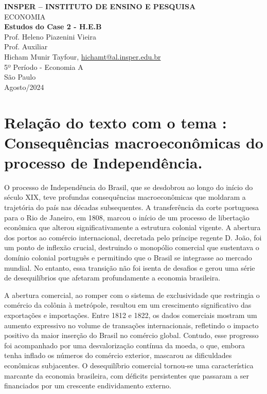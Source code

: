 \documentclass[a4paper,12pt]{article}[abntex2]
\begin{document}
\begin{titlepage}
    \centering
    \vspace*{1cm}
    \Large\textbf{INSPER – INSTITUTO DE ENSINO E PESQUISA}\\
    \Large ECONOMIA\\
    \vspace{1.5cm}
    \Large\textbf{Estudos do Case 2 - H.E.B}\\
    \vspace{1.5cm}
    Prof. Heleno Piazenini Vieira\\
    Prof. Auxiliar \\
    \vfill
    \normalsize
    Hicham Munir Tayfour, \href{mailto:hichamt@al.insper.edu.br}{hichamt@al.insper.edu.br}\\
    5º Período - Economia A\\
    \vfill
    São Paulo\\
    Agosto/2024
\end{titlepage}

\newpage
\tableofcontents
\thispagestyle{empty} %
\newpage
\setcounter{page}{1} %
\justify
\onehalfspacing

\pagestyle{fancy}
\fancyhf{}
\rhead{\thepage}

\section{\textbf{Relação do texto com o tema : Consequências macroeconômicas do processo de Independência.}}

O processo de Independência do Brasil, que se desdobrou ao longo do início do século XIX, teve profundas consequências macroeconômicas que moldaram a trajetória do país nas décadas subsequentes. A transferência da corte portuguesa para o Rio de Janeiro, em 1808, marcou o início de um processo de libertação econômica que alterou significativamente a estrutura colonial vigente. A abertura dos portos ao comércio internacional, decretada pelo príncipe regente D. João, foi um ponto de inflexão crucial, destruindo o monopólio comercial que sustentava o domínio colonial português e permitindo que o Brasil se integrasse ao mercado mundial. No entanto, essa transição não foi isenta de desafios e gerou uma série de desequilíbrios que afetaram profundamente a economia brasileira.

A abertura comercial, ao romper com o sistema de exclusividade que restringia o comércio da colônia à metrópole, resultou em um crescimento significativo das exportações e importações. Entre 1812 e 1822, os dados comerciais mostram um aumento expressivo no volume de transações internacionais, refletindo o impacto positivo da maior inserção do Brasil no comércio global. Contudo, esse progresso foi acompanhado por uma desvalorização contínua da moeda, o que, embora tenha inflado os números do comércio exterior, mascarou as dificuldades econômicas subjacentes. O desequilíbrio comercial tornou-se uma característica marcante da economia brasileira, com déficits persistentes que passaram a ser financiados por um crescente endividamento externo.
\end{document}
